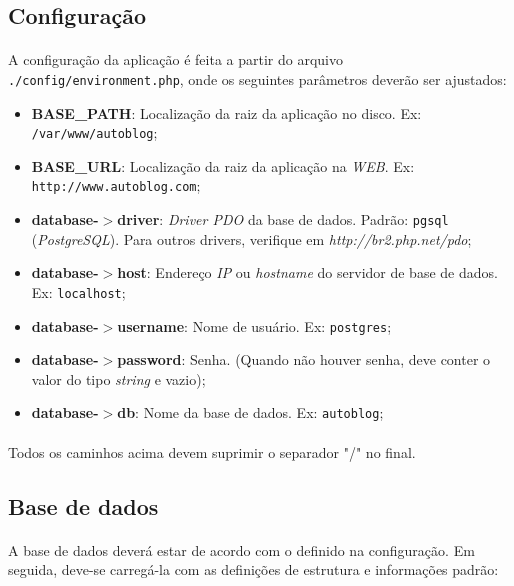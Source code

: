 \documentclass[a4paper,12pt]{article}
\begin{document}
\subsection{Configuração}

\paragraph{}
A configuração da aplicação é feita a partir do arquivo \texttt{./config/environment.php}, onde os seguintes parâmetros deverão ser ajustados:

\begin{itemize}
\item \textbf{BASE\_PATH}: Localização da raiz da aplicação no disco. Ex: \texttt{/var/www/autoblog};
\item \textbf{BASE\_URL}: Localização da raiz da aplicação na \emph{WEB}. Ex: \texttt{http://www.autoblog.com};
\item \textbf{database-$>$driver}: \emph{Driver PDO} da base de dados. Padrão: \texttt{pgsql} (\emph{PostgreSQL}). Para outros drivers, verifique em \emph{http://br2.php.net/pdo};
\item \textbf{database-$>$host}: Endereço \emph{IP} ou \emph{hostname} do servidor de base de dados. Ex: \texttt{localhost};
\item \textbf{database-$>$username}: Nome de usuário. Ex: \texttt{postgres};
\item \textbf{database-$>$password}: Senha. (Quando não houver senha, deve conter o valor do tipo \emph{string} e vazio);
\item \textbf{database-$>$db}: Nome da base de dados. Ex: \texttt{autoblog};
\end{itemize}

\paragraph{}
Todos os caminhos acima devem suprimir o separador "/" no final.

\subsection{Base de dados}

\paragraph{}
A base de dados deverá estar de acordo com o definido na configuração. Em seguida, deve-se carregá-la com as definições de estrutura e informações padrão:
\end{document}
